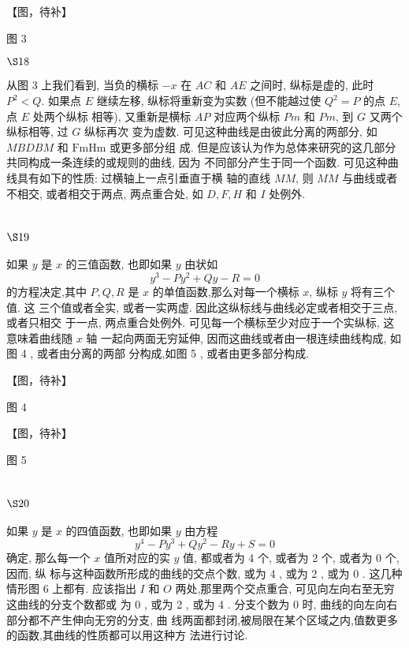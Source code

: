 【图，待补】

图 3

$\S 18$

从图 3 上我们看到, 当负的横标 $-x$ 在 $A C$ 和 $A E$ 之间时, 纵标是虚的, 此时 $P^{2}<Q$. 如果点 $E$ 继续左移, 纵标将重新变为实数 (但不能越过使 $Q^{2}=P$ 的点 $E$, 点 $E$ 处两个纵标 相等), 又重新是横标 $A P$ 对应两个纵标 $P m$ 和 $P m$, 到 $G$ 又两个纵标相等, 过 $G$ 纵标再次 变为虚数. 可见这种曲线是由彼此分离的两部分, 如 $M B D B M$ 和 $\mathrm{Fm} \mathrm{Hm}$ 或更多部分组 成. 但是应该认为作为总体来研究的这几部分共同构成一条连续的或规则的曲线, 因为 不同部分产生于同一个函数. 可见这种曲线具有如下的性质: 过横轴上一点引垂直于横 轴的直线 $M M$, 则 $M M$ 与曲线或者不相交, 或者相交于两点, 两点重合处, 如 $D, F, H$ 和 $I$ 处例外.

\section{$\S 19$}

如果 $y$ 是 $x$ 的三值函数, 也即如果 $y$ 由状如
\[
y^{3}-P y^{2}+Q y-R=0
\]
的方程决定,其中 $P, Q, R$ 是 $x$ 的单值函数,那么对每一个横标 $x$, 纵标 $y$ 将有三个值. 这 三个值或者全实, 或者一实两虚. 因此这纵标线与曲线必定或者相交于三点, 或者只相交 于一点, 两点重合处例外. 可见每一个横标至少对应于一个实纵标, 这意味着曲线随 $x$ 轴 一起向两面无穷延伸, 因而这曲线或者由一根连续曲线构成, 如图 4 , 或者由分离的两部 分构成,如图 5 , 或者由更多部分构成. 


【图，待补】

图 4


【图，待补】

图 5

\section{$\S 20$}

如果 $y$ 是 $x$ 的四值函数, 也即如果 $y$ 由方程
\[
y^{4}-P y^{3}+Q y^{2}-R y+S=0
\]
确定, 那么每一个 $x$ 值所对应的实 $y$ 值, 都或者为 4 个, 或者为 2 个, 或者为 0 个, 因而, 纵 标与这种函数所形成的曲线的交点个数, 或为 4 , 或为 2 , 或为 0 . 这几种情形图 6 上都有. 应该指出 $I$ 和 $O$ 两处,那里两个交点重合, 可见向左向右至无穷这曲线的分支个数都或 为 0 , 或为 2 , 或为 4 . 分支个数为 0 时, 曲线的向左向右部分都不产生伸向无穷的分支, 曲 线两面都封闭,被局限在某个区域之内,值数更多的函数,其曲线的性质都可以用这种方 法进行讨论.


